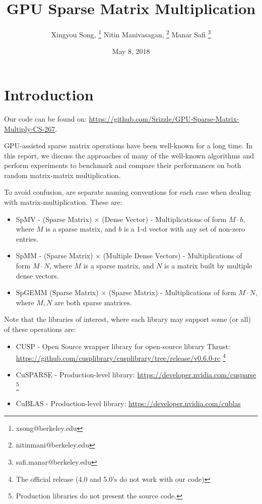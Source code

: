 \documentclass[12pt]{article}
\begin{document}
\nocite{*} 
 

\title{GPU Sparse Matrix Multiplication}
\author{Xingyou Song, \footnote{xsong@berkeley.edu} Nitin Manivasagan, \footnote{nitinmani@berkeley.edu} Manar Safi \footnote{safi.manar@berkeley.edu}}
\date{May 8, 2018} 
\maketitle

\section{Introduction}
Our code can be found on: \url{https://github.com/Srizzle/GPU-Sparse-Matrix-Multiply-CS-267}.

GPU-assisted sparse matrix operations have been well-known for a long time. In this report, we discuss the approaches of many of the well-known algorithms and perform experiments to benchmark and compare their performances on both random matrix-matrix multiplication. 

To avoid confusion, are separate naming conventions for each case when dealing with matrix-multiplication. These are: 
\begin{itemize}
\item SpMV - (Sparse Matrix) $\times$ (Dense Vector) - Multiplications of form $M \cdot b$, where $M$ is a sparse matrix, and $b$ is a 1-d vector with any set of non-zero entries.
\item SpMM - (Sparse Matrix) $\times$ (Multiple Dense Vectors) - Multiplications of form $M \cdot N$, where $M$ is a sparse matrix, and $N$ is a matrix built by multiple dense vectors. 
\item SpGEMM (Sparse Matrix) $\times$ (Sparse Matrix) - Multiplications of form $M \cdot N$, where $M,N$ are both sparse matrices. 
\end{itemize}

Note that the libraries of interest, where each library may support some (or all) of these operations are:

\begin{itemize}
\item CUSP - Open Source wrapper library for open-source library Thrust: \url{https://github.com/cusplibrary/cusplibrary/tree/release/v0.6.0-rc} \footnote{The official release (4.0 and 5.0's do not work with our code) }
\item CuSPARSE - Production-level library: \url{https://developer.nvidia.com/cusparse} \footnote{Production libraries do not present the source code.}
\item CuBLAS - Production-level library: \url{https://developer.nvidia.com/cublas}
\end{itemize}
\end{document}
